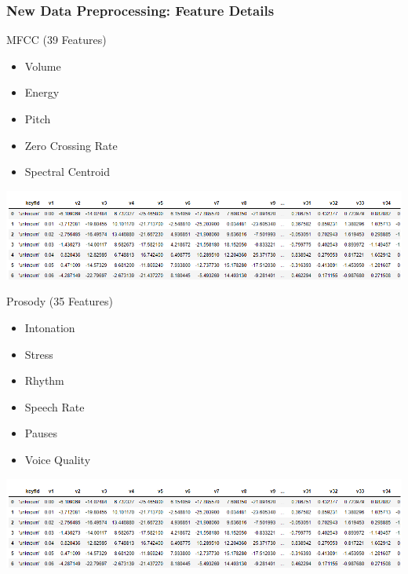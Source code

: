 \documentclass{beamer}
\begin{document}
\begin{frame}
\frametitle{New Data Preprocessing: Feature Details}
\begin{minipage}{0.4\textwidth}
MFCC (39 Features)
    \begin{itemize}
	    \item Volume 
    	\item Energy 
	    \item Pitch
	    \item Zero Crossing Rate
	    \item Spectral Centroid
	\end{itemize}
\end{minipage}
\begin{minipage}{0.58\textwidth}
    \includegraphics[width=\linewidth,height=\textheight,keepaspectratio]{images/MFCC File Layout.png}
\end{minipage}
\begin{minipage}{0.4\textwidth}
\vspace{.15in}
Prosody (35 Features)
    \begin{itemize}
	    \item Intonation 
    	\item Stress 
	    \item Rhythm
	    \item Speech Rate
	 	\item Pauses
	 	\item Voice Quality	   
	\end{itemize}
\end{minipage}
\begin{minipage}{0.58\textwidth}
    \includegraphics[width=\linewidth,height=\textheight,keepaspectratio]{images/MFCC File Layout.png}
\end{minipage}
\end{frame}


\end{document}
